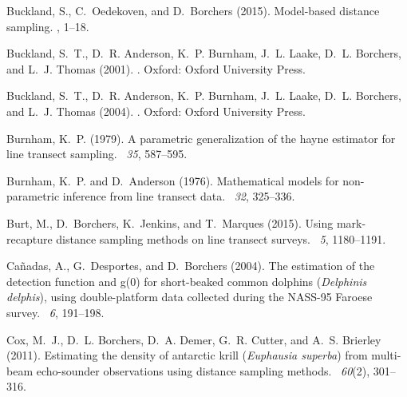 \documentclass[useAMS,usenatbib,referee]{biom}
\begin{document}
\begin{thebibliography}{}
Buckland, S., C.~Oedekoven, and D.~Borchers (2015).
\newblock Model-based distance sampling.
, 1--18.

Buckland, S.~T., D.~R. Anderson, K.~P. Burnham, J.~L. Laake, D.~L. Borchers,
  and L.~J. Thomas (2001).
.
\newblock Oxford: Oxford University Press.

Buckland, S.~T., D.~R. Anderson, K.~P. Burnham, J.~L. Laake, D.~L. Borchers,
  and L.~J. Thomas (2004).
.
\newblock Oxford: Oxford University Press.

Burnham, K.~P. (1979).
\newblock A parametric generalization of the hayne estimator for line transect
  sampling.
~{\em 35}, 587--595.

Burnham, K.~P. and D.~Anderson (1976).
\newblock Mathematical models for non-parametric inference from line transect
  data.
~{\em 32}, 325--336.

Burt, M., D.~Borchers, K.~Jenkins, and T.~Marques (2015).
\newblock Using mark-recapture distance sampling methods on line transect
  surveys.
~{\em 5}, 1180--1191.

Ca\~{n}adas, A., G.~Desportes, and D.~Borchers (2004).
\newblock The estimation of the detection function and g(0) for short-beaked
  common dolphins ({\em Delphinis delphis}), using double-platform data
  collected during the {NASS-95} {F}aroese survey.
~{\em 6},
  191--198.

Cox, M.~J., D.~L. Borchers, D.~A. Demer, G.~R. Cutter, and A.~S. Brierley
  (2011).
\newblock Estimating the density of antarctic krill ({\em Euphausia superba})
  from multi-beam echo-sounder observations using distance sampling methods.
~{\em 60\/}(2), 301–316.


\end{thebibliography}
\end{document}
